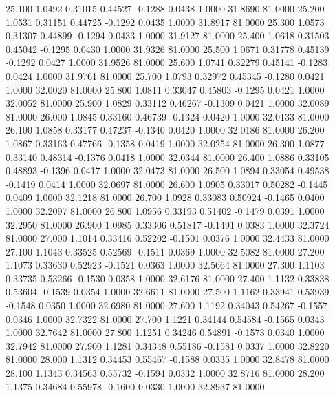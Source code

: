   25.100   1.0492   0.31015   0.44527  -0.1288   0.0438   1.0000  31.8690  81.0000
  25.200   1.0531   0.31151   0.44725  -0.1292   0.0435   1.0000  31.8917  81.0000
  25.300   1.0573   0.31307   0.44899  -0.1294   0.0433   1.0000  31.9127  81.0000
  25.400   1.0618   0.31503   0.45042  -0.1295   0.0430   1.0000  31.9326  81.0000
  25.500   1.0671   0.31778   0.45139  -0.1292   0.0427   1.0000  31.9526  81.0000
  25.600   1.0741   0.32279   0.45141  -0.1283   0.0424   1.0000  31.9761  81.0000
  25.700   1.0793   0.32972   0.45345  -0.1280   0.0421   1.0000  32.0020  81.0000
  25.800   1.0811   0.33047   0.45803  -0.1295   0.0421   1.0000  32.0052  81.0000
  25.900   1.0829   0.33112   0.46267  -0.1309   0.0421   1.0000  32.0089  81.0000
  26.000   1.0845   0.33160   0.46739  -0.1324   0.0420   1.0000  32.0133  81.0000
  26.100   1.0858   0.33177   0.47237  -0.1340   0.0420   1.0000  32.0186  81.0000
  26.200   1.0867   0.33163   0.47766  -0.1358   0.0419   1.0000  32.0254  81.0000
  26.300   1.0877   0.33140   0.48314  -0.1376   0.0418   1.0000  32.0344  81.0000
  26.400   1.0886   0.33105   0.48893  -0.1396   0.0417   1.0000  32.0473  81.0000
  26.500   1.0894   0.33054   0.49538  -0.1419   0.0414   1.0000  32.0697  81.0000
  26.600   1.0905   0.33017   0.50282  -0.1445   0.0409   1.0000  32.1218  81.0000
  26.700   1.0928   0.33083   0.50924  -0.1465   0.0400   1.0000  32.2097  81.0000
  26.800   1.0956   0.33193   0.51402  -0.1479   0.0391   1.0000  32.2950  81.0000
  26.900   1.0985   0.33306   0.51817  -0.1491   0.0383   1.0000  32.3724  81.0000
  27.000   1.1014   0.33416   0.52202  -0.1501   0.0376   1.0000  32.4433  81.0000
  27.100   1.1043   0.33525   0.52569  -0.1511   0.0369   1.0000  32.5082  81.0000
  27.200   1.1073   0.33630   0.52923  -0.1521   0.0363   1.0000  32.5664  81.0000
  27.300   1.1103   0.33735   0.53266  -0.1530   0.0358   1.0000  32.6176  81.0000
  27.400   1.1132   0.33838   0.53604  -0.1539   0.0354   1.0000  32.6611  81.0000
  27.500   1.1162   0.33941   0.53939  -0.1548   0.0350   1.0000  32.6980  81.0000
  27.600   1.1192   0.34043   0.54267  -0.1557   0.0346   1.0000  32.7322  81.0000
  27.700   1.1221   0.34144   0.54584  -0.1565   0.0343   1.0000  32.7642  81.0000
  27.800   1.1251   0.34246   0.54891  -0.1573   0.0340   1.0000  32.7942  81.0000
  27.900   1.1281   0.34348   0.55186  -0.1581   0.0337   1.0000  32.8220  81.0000
  28.000   1.1312   0.34453   0.55467  -0.1588   0.0335   1.0000  32.8478  81.0000
  28.100   1.1343   0.34563   0.55732  -0.1594   0.0332   1.0000  32.8716  81.0000
  28.200   1.1375   0.34684   0.55978  -0.1600   0.0330   1.0000  32.8937  81.0000
